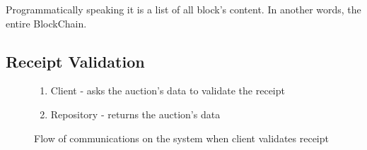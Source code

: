\documentclass[12pt]{article}
\begin{document}
Programmatically speaking it is a list of all block's content. In another words, the entire BlockChain.  

\subsection{Receipt Validation}
\label{subsec:receiptValidation}

\begin{figure}[h]
  \caption{Flow of communications on the system when client validates receipt}
  \label{fig:validateReceipt}

  \begin{enumerate}
    \item Client - asks the auction's data to validate the receipt
    \item Repository - returns the auction's data 

\end{enumerate}
\end{figure}
\end{document}
